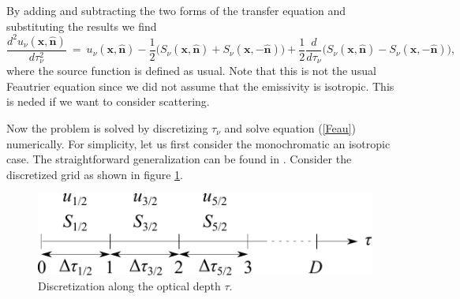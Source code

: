 \documentclass[]{article}
\begin{document}
By adding and subtracting the two forms of the transfer equation and substituting the results we find
\begin{equation}
\frac{d^{2} u_{\nu}(\textbf{x},\hat{\textbf{n}})}{d \tau_{\nu}^{2}} \ = \ u_{\nu}(\textbf{x},\hat{\textbf{n}}) - \frac{1}{2}\big( S_{\nu}(\textbf{x},\hat{\textbf{n}}) + S_{\nu}(\textbf{x},-\hat{\textbf{n}}) \big) + \frac{1}{2} \frac{d}{d\tau_{\nu}} \big( S_{\nu}(\textbf{x},\hat{\textbf{n}}) -  S_{\nu}(\textbf{x},-\hat{\textbf{n}}) \big) ,
\label{Feau}
\end{equation}
where the source function is defined as usual. Note that this is not the usual Feautrier equation since we did not assume that the emissivity is isotropic. This is neded if we want to consider scattering.

\bigskip

Now the problem is solved by discretizing $\tau_{\nu}$ and solve equation (\ref{Feau}) numerically. For simplicity, let us first consider the monochromatic an isotropic case. The straightforward generalization can be found in \cite{Mihalas_s, MihalasMihalas}. Consider the discretized grid as shown in figure \ref{grid}.
\begin{figure}[H]
	\centering
	\includegraphics[scale=.5]{Images/grid.pdf}
	\caption{Discretization along the optical depth $\tau$.}
	\label{grid}
\end{figure}
\end{document}
